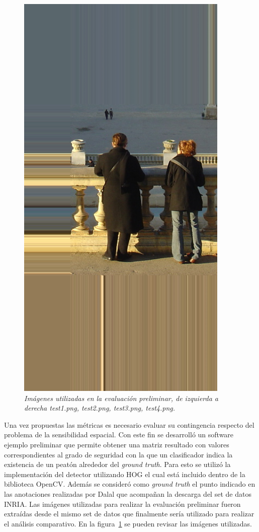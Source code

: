 \begin{figure}[htc]
  \includegraphics[scale=.25]{images/test4}
  \caption{\em Imágenes utilizadas en la evaluación preliminar, de izquierda a derecha test1.png, test2.png, test3.png, test4.png.}  
  \label{fig:testpersons}
\end{figure}

Una vez propuestas las métricas es necesario evaluar su contingencia respecto del problema de la sensibilidad espacial. Con este fin se desarrolló un software ejemplo preliminar que permite obtener una matriz resultado con valores correspondientes al grado de seguridad con la que un clasificador indica la existencia de un peatón alrededor del \textit{ground truth}. Para  esto se utilizó la implementación del detector utilizando HOG el cual está incluido dentro de la biblioteca OpenCV. Además se consideró como \textit{ground truth} el punto indicado en las anotaciones realizadas por Dalal que acompañan la descarga del set de datos INRIA. 
Las imágenes utilizadas para realizar la evaluación preliminar fueron extraídas desde el mismo set de datos que finalmente sería utilizado para realizar el análisis comparativo. En la figura~\ref{fig:testpersons} se pueden revisar las imágenes utilizadas.

